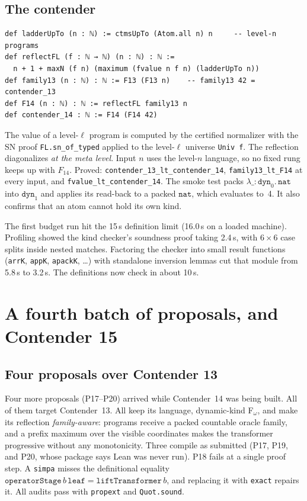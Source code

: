 \documentclass[11pt]{article}
\theoremstyle{definition}
\theoremstyle{remark}
\newcommand{\lean}[1]{\texttt{#1}}
\begin{document}
\subsection{The contender}
\begin{lstlisting}
def ladderUpTo (n : ℕ) := ctmsUpTo (Atom.all n) n     -- level-n programs
def reflectFL (f : ℕ → ℕ) (n : ℕ) : ℕ :=
  n + 1 + maxN (f n) (maximum (fvalue n f n) (ladderUpTo n))
def family13 (n : ℕ) : ℕ := F13 (F13 n)    -- family13 42 = contender_13
def F14 (n : ℕ) : ℕ := reflectFL family13 n
def contender_14 : ℕ := F14 (F14 42)
\end{lstlisting}
The value of a level-$\ell$ program is computed by the certified normalizer
with the SN proof \lean{FL.sn\_of\_typed} applied to the level-$\ell$ universe
\lean{Univ f}. The reflection
diagonalizes \emph{at the meta level}. Input $n$ uses the level-$n$ language,
so no fixed rung keeps up with $F_{14}$. Proved:
\lean{contender\_13\_lt\_\allowbreak contender\_14},
\lean{family13\_lt\_F14} at every input, and
\lean{fvalue\_lt\_\allowbreak contender\_14}. The smoke test packs
$\lambda\_{:}\mathtt{dyn}_0.\,\mathtt{nat}$ into $\mathtt{dyn}_1$ and applies its
read-back to a packed $\mathtt{nat}$, which evaluates to~4. It also confirms that
an atom cannot hold its own kind.

The first budget run hit the 15\,s definition limit (16.0\,s on a loaded
machine). Profiling showed the kind checker's soundness proof taking 2.4\,s,
with $6\times6$ case splits inside nested matches. Factoring the checker into
small result functions (\lean{arrK}, \lean{appK}, \lean{apackK}, \dots) with
standalone inversion lemmas cut that module from 5.8\,s to 3.2\,s. The
definitions now check in about 10\,s.

\section{A fourth batch of proposals, and Contender 15}

\subsection{Four proposals over Contender 13}
Four more proposals (P17--P20) arrived while Contender~14 was being built.
All of them target Contender~13. All keep its language, dynamic-kind
F$_\omega$, and make its reflection \emph{family-aware}: programs receive a
packed countable oracle family, and a prefix maximum over the visible
coordinates makes the transformer progressive without any monotonicity.
Three compile as submitted (P17, P19, and P20, whose package says Lean was
never run). P18 fails at a single proof step. A \lean{simpa} misses the
definitional equality
$\mathtt{operatorStage}\,b\,\mathtt{leaf}=\mathtt{liftTransformer}\,b$, and
replacing it with \lean{exact} repairs it. All audits pass with
\lean{propext} and \lean{Quot.sound}.
\end{document}
